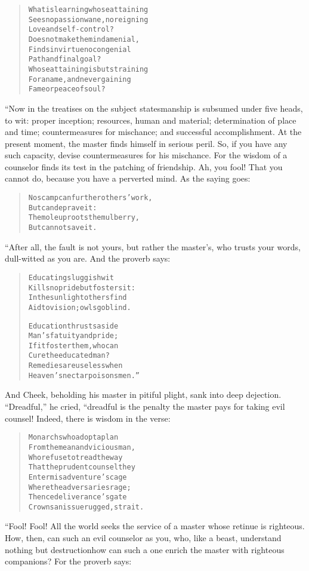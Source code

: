 \documentclass[article, twoside, 10pt]{memoir}
\renewenvironment{verbatim}{%
\begin{quote}%
\vskip -10pt%
\begin{alltt}\normalfont\small}{\end{alltt}%
\end{quote}%
\vskip -10pt
} %
\begin{document}
\begin{verbatim}
What is learning whose attaining
Sees no passion wane, no reigning
    Love and self-control?
Does not make the mind a menial,
Finds in virtue no congenial
    Path and final goal?
Whose attaining is but straining
For a name, and never gaining
    Fame or peace of soul?
\end{verbatim}
“Now in the treatises on the subject statesmanship is subsumed
under five heads, to wit: proper inception; resources, human and
material; determination of place and time; countermeasures for
mischance; and successful accomplishment. At the present moment,
the master finds himself in serious peril. So, if you have any such
capacity, devise countermeasures for his mischance. For the wisdom
of a counselor finds its test in the patching of friendship. Ah,
you fool! That you cannot do, because you have a perverted mind. As
the saying goes:

\begin{verbatim}
No scamp can further others' work,
    But can deprave it:
The mole uproots the mulberry,
    But cannot save it.
\end{verbatim}
“After all, the fault is not yours, but rather the master's, who
trusts your words, dull-witted as you are. And the proverb says:

\begin{verbatim}
Educating sluggish wit
Kills no pride but fosters it:
In the sunlight others find
Aid to vision; owls go blind.

Education thrusts aside
Man's fatuity and pride;
If it foster them, who can
Cure the educated man?
Remedies are useless when
Heaven's nectar poisons men.”
\end{verbatim}
And Cheek, beholding his master in pitiful plight, sank into deep
dejection. ``Dreadful,'' he cried, “dreadful is the penalty the
master pays for taking evil counsel! Indeed, there is wisdom in the
verse:

\begin{verbatim}
Monarchs who adopt a plan
From the mean and vicious man,
Who refuse to tread the way
That the prudent counsel{\textemdash}they
Enter misadventure's cage
Where the adversaries rage;
Thence deliverance's gate
Crowns an issue rugged, strait.
\end{verbatim}
“Fool! Fool! All the world seeks the service of a master whose
retinue is righteous. How, then, can such an evil counselor as you,
who, like a beast, understand nothing but destruction{\textemdash}how can
such a one enrich the master with righteous companions? For the
proverb says:
\end{document}

